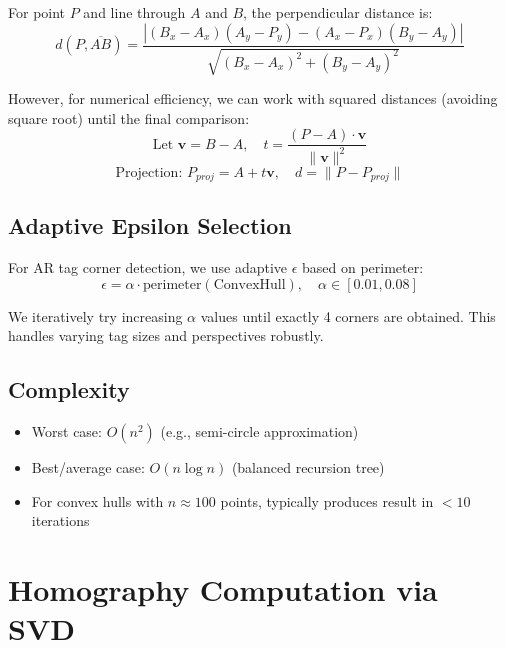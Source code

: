 \documentclass[9pt,a4paper,twocolumn,twoside]{tau-class/tau}
\begin{document}
    For point $P$ and line through $A$ and $B$, the perpendicular distance is:
    \begin{equation}
        d(P, \overline{AB}) = \frac{|(B_x - A_x)(A_y - P_y) - (A_x - P_x)(B_y - A_y)|}{\sqrt{(B_x - A_x)^2 + (B_y - A_y)^2}}
    \end{equation}

    However, for numerical efficiency, we can work with squared distances (avoiding square root) until the final comparison:
    \begin{equation}
        \text{Let } \mathbf{v} = B - A, \quad t = \frac{(P - A) \cdot \mathbf{v}}{\|\mathbf{v}\|^2}
    \end{equation}
    \begin{equation}
        \text{Projection: } P_{proj} = A + t \mathbf{v}, \quad d = \|P - P_{proj}\|
    \end{equation}

    \subsection{Adaptive Epsilon Selection}

    For AR tag corner detection, we use adaptive $\epsilon$ based on perimeter:
    \begin{equation}
        \epsilon = \alpha \cdot \text{perimeter}(\text{ConvexHull}), \quad \alpha \in [0.01, 0.08]
    \end{equation}

    We iteratively try increasing $\alpha$ values until exactly 4 corners are obtained. This handles varying tag sizes and perspectives robustly.

    \subsection{Complexity}

    \begin{itemize}
        \item Worst case: $O(n^2)$ (e.g., semi-circle approximation)
        \item Best/average case: $O(n \log n)$ (balanced recursion tree)
        \item For convex hulls with $n \approx 100$ points, typically produces result in $<10$ iterations
    \end{itemize}

\section{Homography Computation via SVD}
\end{document}
